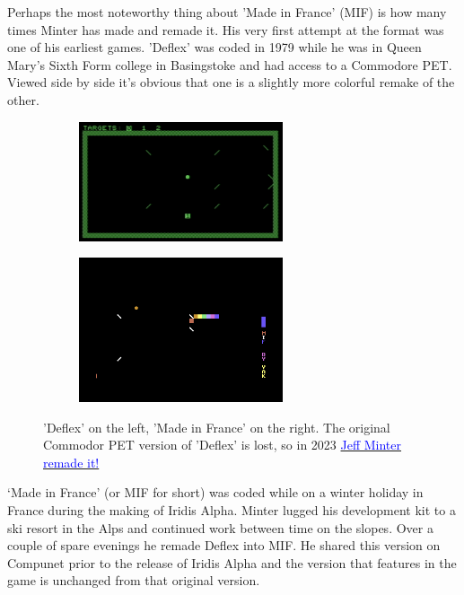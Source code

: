 Perhaps the most noteworthy thing about 'Made in France' (MIF) is how many times Minter has made and remade it. His very
first attempt at the format was one of his earliest games. 'Deflex' was coded in 1979 while he was in Queen Mary's Sixth Form college
in Basingstoke and had access to a 
Commodore PET. Viewed side by side it's obvious that one is a slightly more colorful
remake of the other.

\begin{figure}[H]
  {
    \setlength{\tabcolsep}{3.0pt}
    \setlength\cmidrulewidth{\heavyrulewidth} %
	\centering
	\begin{subfigure}{0.5\textwidth}
    \includegraphics[width=6cm]{src/mif/deflex.png}%
	\end{subfigure}
	\begin{subfigure}{0.5\textwidth}
      \includegraphics[width=6cm]{src/mif/mif_game.png}%
	\end{subfigure}
  }

\caption{'Deflex' on the left, 'Made in France' on the right. The original Commodor PET version of 'Deflex' is lost, so in 2023 
  \href{https://archive.org/details/deflex-remake}{\textcolor{blue}{Jeff Minter remade it!}}}
\end{figure}

`Made in France' (or MIF for short) was coded while on a winter holiday in France during the making of Iridis Alpha. Minter lugged his development kit to
a ski resort in the Alps and continued work between time on the slopes. Over a couple of spare evenings he remade Deflex into
MIF. He shared this version on Compunet prior to the release of Iridis Alpha and the version that features in the game is unchanged
from that original version.


